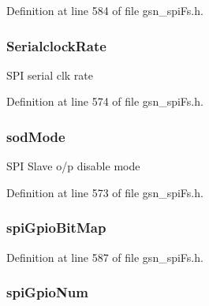 Definition at line 584 of file gsn\_\-spiFs.h.

\hypertarget{a00233_aceb3f680c7de4959ad53b0e20baf8a5c}{
\subsubsection[{SerialclockRate}]{ {\bf SerialclockRate}}}
\label{a00233_aceb3f680c7de4959ad53b0e20baf8a5c}
SPI serial clk rate 

Definition at line 574 of file gsn\_\-spiFs.h.

\hypertarget{a00233_a25db6532bb07468abba98f1872303945}{
\subsubsection[{sodMode}]{ {\bf sodMode}}}
\label{a00233_a25db6532bb07468abba98f1872303945}
SPI Slave o/p disable mode 

Definition at line 573 of file gsn\_\-spiFs.h.

\hypertarget{a00233_a0b3967ea299cf8eb236778533abc97be}{
\subsubsection[{spiGpioBitMap}]{ {\bf spiGpioBitMap}}}
\label{a00233_a0b3967ea299cf8eb236778533abc97be}


Definition at line 587 of file gsn\_\-spiFs.h.

\hypertarget{a00233_acc43f8ead3863da116dd2976ae02bb92}{
\subsubsection[{spiGpioNum}]{ {\bf spiGpioNum}}}
\label{a00233_acc43f8ead3863da116dd2976ae02bb92}


